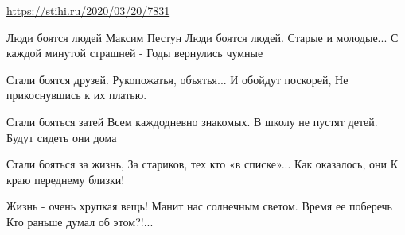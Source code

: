  
 
 
 
 

\url{https://stihi.ru/2020/03/20/7831}

Люди боятся людей
Максим Пестун
Люди боятся людей.
Старые и молодые...
С каждой минутой страшней -
Годы вернулись чумные

Стали боятся друзей.
Рукопожатья, объятья...
И обойдут поскорей,
Не прикоснувшись к их платью.

Стали бояться затей
Всем каждодневно знакомых.
В школу не пустят детей.
Будут сидеть они дома

Стали бояться за жизнь,
За стариков, тех кто «в списке»...
Как оказалось, они
К краю переднему близки!

Жизнь - очень хрупкая вещь!
Манит нас солнечным светом.
Время ее поберечь
Кто раньше думал об этом?!...
